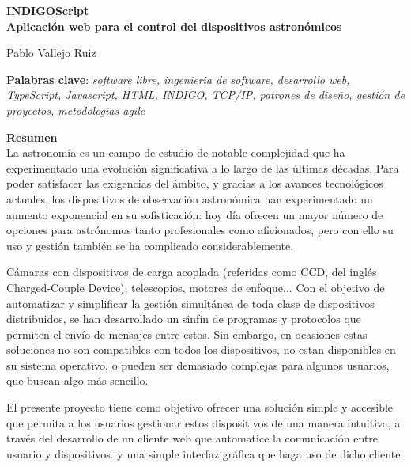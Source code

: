 \thispagestyle{empty}

\begin{center}
{\large\bfseries INDIGOScript \\ Aplicación web para el control del dispositivos astronómicos }\\
\end{center}
\begin{center}
Pablo Vallejo Ruiz\\
\end{center}


\vspace{0.5cm}
\noindent\textbf{Palabras clave}: \textit{software libre, ingenieria de software, desarrollo web, TypeScript, Javascript, HTML, INDIGO, TCP/IP, patrones de diseño, gestión de proyectos, metodologias agile}
\vspace{0.7cm}

\noindent\textbf{Resumen}\\
La astronomía es un campo de estudio de notable complejidad que ha experimentado una evolución significativa a lo largo de las últimas décadas. Para poder satisfacer las exigencias del ámbito, y gracias a los avances tecnológicos actuales, los dispositivos de observación astronómica han experimentado un aumento exponencial en su sofisticación: hoy día ofrecen un mayor número de opciones para astrónomos tanto profesionales como aficionados, pero con ello su uso y gestión también se ha complicado considerablemente. 

Cámaras con dispositivos de carga acoplada (referidas como CCD, del inglés Charged-Couple Device), telescopios, motores de enfoque... Con el objetivo de automatizar y simplificar la gestión simultánea de toda clase de dispositivos distribuidos, se han desarrollado un sinfín de programas y protocolos que permiten el envío de mensajes entre estos. Sin embargo, en ocasiones estas soluciones no son compatibles con todos los dispositivos, no estan disponibles en su sistema operativo, o pueden ser demasiado complejas para algunos usuarios, que buscan algo más sencillo.

El presente proyecto tiene como objetivo ofrecer una solución simple y accesible que permita a los usuarios gestionar estos dispositivos de una manera intuitiva, a través del desarrollo de un cliente web que automatice la comunicación entre usuario y dispositivos. y una simple interfaz gráfica que haga uso de dicho cliente.


